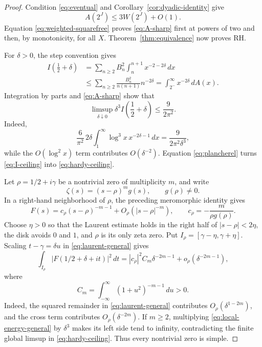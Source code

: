 \documentclass[11pt,a4paper]{amsart}
\theoremstyle{definition}
\theoremstyle{remark}
\begin{document}
\begin{proof}
Condition \eqref{eq:eventual} and
Corollary~\ref{cor:dyadic-identity} give
\[
 A(2^J)\leq3W(2^J)+O(1).
\]
Equation \eqref{eq:weighted-squarefree} proves \eqref{eq:A-sharp} first at
powers of two and then, by monotonicity, for all $X$.
Theorem~\ref{thm:equivalence} now proves RH.

For $\delta>0$, the step convention gives
\begin{align*}
 I\left(\frac12+\delta\right)
 &=\sum_{n\geq2}B_n^2\int_n^{n+1}x^{-2-2\delta}\,dx\\
 &\leq\sum_{n\geq2}
 \frac{B_n^2}{n(n+1)}n^{-2\delta}
 =\int_{2^-}^{\infty}x^{-2\delta}\,dA(x).
\end{align*}
Integration by parts and \eqref{eq:A-sharp} show that
\begin{equation}\label{eq:I-ceiling}
 \limsup_{\delta\downarrow0}\delta^3
 I\left(\frac12+\delta\right)
 \leq\frac{9}{2\pi^2}.
\end{equation}
Indeed,
\[
 \frac{6}{\pi^2}\,2\delta
 \int_1^\infty \log^3x\,x^{-2\delta-1}\,dx
 =\frac{9}{2\pi^2\delta^3},
\]
while the $O(\log^2x)$ term contributes $O(\delta^{-2})$.
Equation \eqref{eq:plancherel} turns \eqref{eq:I-ceiling} into
\eqref{eq:hardy-ceiling}.

Let $\rho=1/2+i\gamma$ be a nontrivial zero of multiplicity $m$, and write
\[
 \zeta(s)=(s-\rho)^m g(s),\qquad g(\rho)\neq0.
\]
In a right-hand neighborhood of $\rho$, the preceding meromorphic identity
gives
\begin{equation}\label{eq:laurent-general}
 F(s)=c_\rho(s-\rho)^{-m-1}
 +O_\rho(|s-\rho|^{-m}),
 \qquad c_\rho=-\frac{m}{\rho g(\rho)}.
\end{equation}
Choose $\eta>0$ so that the Laurent estimate holds in the right half of
$|s-\rho|<2\eta$, the disk avoids $0$ and $1$, and $\rho$ is its only
zeta zero.  Put $I_\rho=[\gamma-\eta,\gamma+\eta]$.  Scaling
$t-\gamma=\delta u$ in \eqref{eq:laurent-general} gives
\begin{equation}\label{eq:local-energy-general}
 \int_{I_\rho}|F(1/2+\delta+it)|^2\,dt
 =|c_\rho|^2C_m\delta^{-2m-1}+o_\rho(\delta^{-2m-1}),
\end{equation}
where
\[
 C_m=\int_{-\infty}^{\infty}(1+u^2)^{-m-1}\,du>0.
\]
Indeed, the squared remainder in \eqref{eq:laurent-general} contributes
$O_\rho(\delta^{1-2m})$, and the cross term contributes
$O_\rho(\delta^{-2m})$.  If $m\geq2$, multiplying
\eqref{eq:local-energy-general} by $\delta^3$ makes its left side tend to
infinity, contradicting the finite global limsup in
\eqref{eq:hardy-ceiling}.  Thus every nontrivial zero is simple.


\end{proof}
\end{document}
